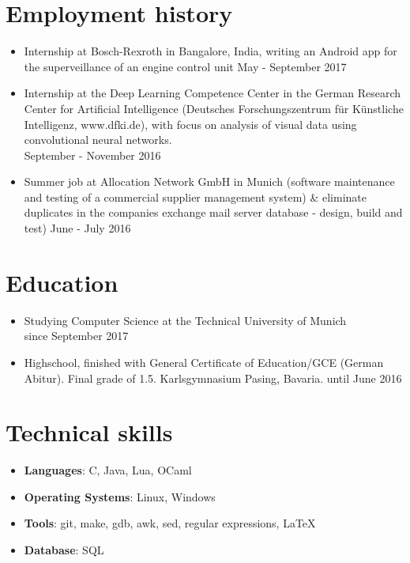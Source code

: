 \documentclass[11pt,a4paper]{article}
\begin{document}
\section*{Employment history}
\begin{itemize}
	\setlength{\itemsep}{1pt}
	\item Internship at Bosch-Rexroth in Bangalore, India, writing an Android app for the superveillance of an engine control unit \hfill May - September 2017
	\item Internship at the Deep Learning Competence Center in the German Research Center for Artificial Intelligence
	(Deutsches Forschungszentrum für Künstliche Intelligenz, www.dfki.de), with focus on analysis of
	visual data using convolutional neural networks.\\
	\hfill September - November 2016
	\item Summer job at Allocation Network GmbH in Munich (software maintenance and testing of a commercial supplier management system) \& eliminate duplicates in the companies exchange mail
	server database - design, build and test)
	\hfill June - July 2016
\end{itemize}

\section*{Education}
\begin{itemize}
	\setlength{\itemsep}{1pt}
	\item[] Studying Computer Science at the Technical University of Munich\\
	\hfill since September 2017
	\item[] Highschool, finished with General Certificate of Education/GCE (German Abitur).
	Final grade of 1.5. Karlsgymnasium Pasing, Bavaria.
	\hfill until June 2016
\end{itemize}

\section*{Technical skills}
\begin{itemize}
	\setlength{\itemsep}{1pt}
	\item[]{\bf Languages}: C, Java, Lua, OCaml
	\item[]{\bf Operating Systems}: Linux, Windows
	\item[]{\bf Tools}: git, make, gdb, awk, sed, regular expressions, LaTeX
	\item[]{\bf Database}: SQL
\end{itemize}
\end{document}
